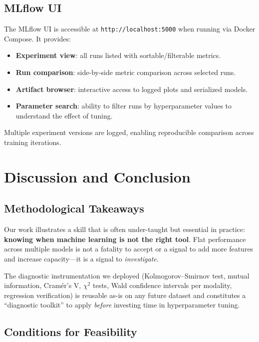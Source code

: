 \documentclass[a4paper,12pt]{article}
\begin{document}
\subsection{MLflow UI}

The MLflow UI is accessible at \texttt{http://localhost:5000} when running via Docker Compose. It provides:
\begin{itemize}[leftmargin=2cm]
    \item \textbf{Experiment view}: all runs listed with sortable/filterable metrics.
    \item \textbf{Run comparison}: side-by-side metric comparison across selected runs.
    \item \textbf{Artifact browser}: interactive access to logged plots and serialized models.
    \item \textbf{Parameter search}: ability to filter runs by hyperparameter values to understand the effect of tuning.
\end{itemize}

Multiple experiment versions are logged, enabling reproducible comparison across training iterations.

\section{Discussion and Conclusion}
\label{sec:discussion}

\subsection{Methodological Takeaways}

Our work illustrates a skill that is often under-taught but essential in practice: \textbf{knowing when machine learning is not the right tool}. Flat performance across multiple models is not a fatality to accept or a signal to add more features and increase capacity---it is a signal to \emph{investigate}.

The diagnostic instrumentation we deployed (Kolmogorov--Smirnov test, mutual information, Cram\'er's V, $\chi^2$ tests, Wald confidence intervals per modality, regression verification) is reusable as-is on any future dataset and constitutes a ``diagnostic toolkit'' to apply \emph{before} investing time in hyperparameter tuning.

\subsection{Conditions for Feasibility}
\end{document}
